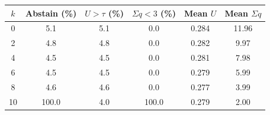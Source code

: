 \begin{tabular}{@{}cccccc@{}}
\toprule
$k$ & Abstain (\%) & $U{>}\tau$ (\%) & $\Sigma q{<}3$ (\%) & Mean $U$ & Mean $\Sigma q$ \\
\midrule
0 & 5.1 & 5.1 & 0.0 & 0.284 & 11.96 \\
2 & 4.8 & 4.8 & 0.0 & 0.282 & 9.97 \\
4 & 4.5 & 4.5 & 0.0 & 0.281 & 7.98 \\
6 & 4.5 & 4.5 & 0.0 & 0.279 & 5.99 \\
8 & 4.6 & 4.6 & 0.0 & 0.277 & 3.99 \\
10 & 100.0 & 4.0 & 100.0 & 0.279 & 2.00 \\
\bottomrule
\end{tabular}

